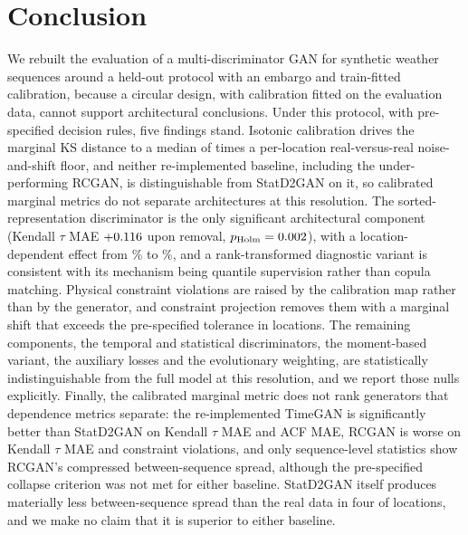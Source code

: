 \documentclass[preprint,12pt]{elsarticle}
\begin{document}
\section{Conclusion}
\label{sec:conclusion}

We rebuilt the evaluation of a multi-discriminator GAN for synthetic
weather sequences around a held-out protocol with an embargo and
train-fitted calibration, because a circular design, with calibration
fitted on the evaluation data, cannot support architectural conclusions.
Under this protocol, with pre-specified decision rules, five
findings stand.  Isotonic calibration drives the marginal KS distance
to a median of \ksRatioFullMedian{} times a per-location real-versus-real
noise-and-shift floor, and neither re-implemented baseline, including the
under-performing RCGAN, is distinguishable from StatD2GAN on it, so calibrated
marginal metrics do not separate architectures at this resolution.  The
sorted-representation discriminator is the only significant
architectural component (Kendall $\tau$ MAE $+0.116$ upon removal,
$p_{\mathrm{Holm}}=0.002$), with a location-dependent effect from
\pctNoDSortedTauLhasa\% to \pctNoDSortedTauDubai\%, and a rank-transformed
diagnostic variant is consistent with its mechanism being quantile
supervision rather than copula matching.  Physical
constraint violations are raised by the calibration map rather than by the
generator, and constraint projection removes them with a marginal shift that
exceeds the pre-specified tolerance in \phDKsLocsOverThrWord{} locations.
The remaining components, the temporal and statistical discriminators,
the moment-based variant, the auxiliary losses and the evolutionary
weighting, are statistically
indistinguishable from the full model at this resolution, and we report those nulls
explicitly.  Finally, the calibrated marginal metric does not rank
generators that dependence metrics separate: the re-implemented TimeGAN
is significantly better than StatD2GAN on Kendall $\tau$ MAE and ACF MAE,
RCGAN is worse on Kendall $\tau$ MAE and constraint violations, and only
sequence-level statistics show RCGAN's compressed between-sequence
spread, although the pre-specified collapse criterion was not met for
either baseline.  StatD2GAN itself produces materially less between-sequence spread
than the real data in four of \nLocsProtoWord{} locations, and we make no
claim that it is superior to either baseline.
\end{document}
